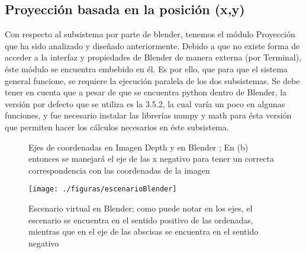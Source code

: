 \documentclass[a4paper,openright,12pt]{report}
\begin{document}
\subsection{Proyección basada en la posición (x,y)}
Con respecto al subsistema por parte de blender, tenemos el módulo Proyección que ha sido analizado y diseñado anteriormente. Debido a que no existe forma de acceder a la interfaz y propiedades de Blender de manera externa (por Terminal), éste módulo se encuentra embebido en él. Es por ello, que para que el sistema general funcione, se requiere la ejecución paralela de los dos subsistemas. Se debe tener en cuenta que a pesar de que se encuentra python dentro de Blender, la versión por defecto que se utiliza es la 3.5.2, la cual varía un poco en algunas funciones, y fue necesario instalar las librerías numpy y math para ésta versión que permiten hacer los cálculos necesarios en éste subsistema.\\
\begin{figure}[htb]
	\centering
	\caption[Ejes de coordenadas en Imagen Depth y en Blender]{Ejes de coordenadas en Imagen Depth y en Blender ; En (b) entonces se manejará el eje de las x negativo para tener un correcta correspondencia con las coordenadas de la imagen} \label{fig:coords}
\end{figure}

\begin{figure}[thb]
	\centering
	\vspace*{5mm}
	\texttt{[image: ./figuras/escenarioBlender]}
	\caption[Escenario virtual en Blender]{Escenario virtual en Blender; como puede notar en los ejes, el escenario se encuentra en el sentido positivo de las ordenadas, mientras que en el eje de las abscisas se encuentra en el sentido negativo} \label{fig:escenarioBlender}
\end{figure}
\end{document}
